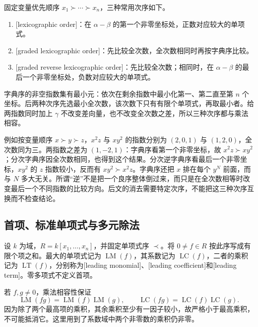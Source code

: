\ProseParagraphBreak
固定变量优先顺序 \(x_1\succ\cdots\succ x_n\)，三种常用次序如下。
\begin{enumerate}
	\item {}[lexicographic order]：在 \(\alpha-\beta\) 的第一个非零坐标处，正数对应较大的单项式。
	\item {}[graded lexicographic order]：先比较全次数，全次数相同时再按字典序比较。
	\item {}[graded reverse lexicographic order]：先比较全次数；相同时，在 \(\alpha-\beta\) 的最后一个非零坐标处，负数对应较大的单项式。
\end{enumerate}
字典序的非空指数集有最小元：依次在剩余指数中最小化第一、第二直至第 \(n\) 个坐标。后两种次序先选最小全次数，该次数下只有有限个单项式，再取最小者。给两指数同时加上 \(\gamma\) 不改变差向量，也不改变全次数之差，所以三种次序都与乘法相容。

\ProseParagraphBreak
例如按变量顺序 \(x\succ y\succ z\)，\(x^2z\) 与 \(xy^2\) 的指数分别为 \((2,0,1)\) 与 \((1,2,0)\)，全次数同为三。两指数之差为 \((1,-2,1)\)：字典序看第一个非零坐标，故 \(x^2z\succ xy^2\)；分次字典序因全次数相同，也得到这个结果。分次逆字典序看最后一个非零坐标，\(xy^2\) 的 \(z\) 指数较小，反而有 \(xy^2\succ x^2z\)。字典序还把 \(x\) 排在每个 \(y^N\) 前面，而与 \(N\) 多大无关。所谓“逆”不是把一个良序整体倒过来，而只是在全次数相等时改变最后一个不同指数的比较方向。后文的消去需要特定次序，不能把这三种次序互换而不检查结论。

\subsection{首项、标准单项式与多元除法}
\label{b3:subsec:0801:02}

\begin{definition}\label{b3:def:leading-data}
	设 \(k\) 为域，\(R=k[x_1,\ldots,x_n]\)，并固定单项式序 \(\prec\)。将 \(0\ne f\in R\) 按此序写成有限个项之和。最大的单项式记为 \(\operatorname{LM}(f)\)，其系数记为 \(\operatorname{LC}(f)\)，二者的乘积记为 \(\operatorname{LT}(f)\)，分别称为[leading monomial]、[leading coefficient]和[leading term]。零多项式不定义首项。
\end{definition}

若 \(f,g\ne0\)，乘法相容性保证
\[
	\operatorname{LM}(fg)=\operatorname{LM}(f)\operatorname{LM}(g), \qquad \operatorname{LC}(fg)=\operatorname{LC}(f)\operatorname{LC}(g).
\]
因为除了两个最高项的乘积，其余乘积至少有一因子较小，故严格小于最高乘积，不可能抵消它。这里用到了系数域中两个非零数的乘积仍非零。

